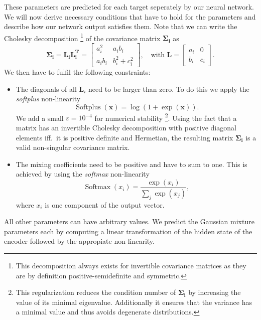 \documentclass[nobib]{tufte-handout}
\begin{document}
These parameters are predicted for each target seperately by our neural network.
We will now derive necessary conditions that have to hold for the parameters and describe how our network output satisfies them.
Note that we can write the Cholesky decomposition
\footnote{This decomposition always exists for invertible covariance matrices as they are by definition positive-semidefinite and symmetric.}
of the covariance matrix \(\bm{\Sigma_i}\) as
\begin{equation*}
  \bm{\Sigma_i} = \bm{L_i} \bm{L_i^T} =
  \begin{bmatrix}
    a_i^2 & a_ib_i \\
    a_ib_i & b_i^2 + c_i^2
  \end{bmatrix} ,\quad
   \text{with } \bm{L} =
   \begin{bmatrix}
     a_i & 0 \\
     b_i & c_i
   \end{bmatrix}.
\end{equation*}
We then have to fulfil the following constraints:
\begin{itemize}
\item The diagonals of all \(\bm{L}_i\) need to be larger than zero.
  To do this we apply the \textit{softplus} non-linearity
  \begin{equation*}
   \operatorname{Softplus} (\bm{x}) = \log \left( 1 + \exp (\bm{x}) \right).
  \end{equation*}
  We add a small \(\varepsilon = 10^{-4}\) for numerical stability
  \footnote{This regularization reduces the condition number of \(\bm{\Sigma_i}\) by increasing the value of its minimal eigenvalue.
  Additionally it ensures that the variance has a minimal value and thus avoids degenerate distributions.}. %
  Using the fact that a matrix has an invertible Cholesky decomposition with positive diagonal elements iff.\ it is positive definite and Hermetian,
  the resulting matrix \(\bm{\Sigma_i}\) is a valid non-singular covariance matrix.
\item The mixing coefficients need to be positive and have to sum to one.
  This is achieved by using the \textit{softmax} non-linearity
  \begin{equation*}
    \operatorname{Softmax} (x_i) = \frac{\exp (x_i)}{\sum_j \exp (x_j)},
  \end{equation*}
  where \(x_i\) is one component of the output vector.
\end{itemize}
All other parameters can have arbitrary values.
We predict the Gaussian mixture parameters each by computing a linear transformation of the hidden state of the encoder followed by the appropiate non-linearity.
\end{document}
